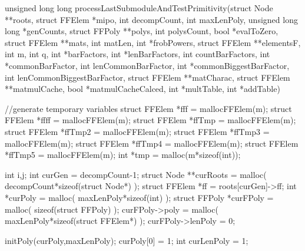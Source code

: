 \begin{ccode}[caption={[\texttt{unsigned long long
  processLastSubmoduleAndTestPrimitivity} aus 
 \url{../Sage/enumeratePCNs.c}]Aus \url{../Sage/enumeratePCNs.c}},
  label=lst:processLastSubmodule]
unsigned long long processLastSubmoduleAndTestPrimitivity(struct Node **roots,
        struct FFElem *mipo, int decompCount,
        int maxLenPoly, 
        unsigned long long *genCounts, 
        struct FFPoly **polys, int polysCount, bool *evalToZero,
        struct FFElem **mats, int matLen, int *frobPowers,
        struct FFElem **elementsF,
        int m, int q, 
        int *barFactors, int *lenBarFactors, int countBarFactors,
        int *commonBarFactor, int lenCommonBarFactor,
        int *commonBiggestBarFactor, int lenCommonBiggestBarFactor,
        struct FFElem **matCharac,
        struct FFElem **matmulCache, bool *matmulCacheCalced,
        int *multTable, int *addTable){
    //generate temporary variables
    struct FFElem *fff = mallocFFElem(m);
    struct FFElem *ffff = mallocFFElem(m);
    struct FFElem *ffTmp = mallocFFElem(m);
    struct FFElem *ffTmp2 = mallocFFElem(m);
    struct FFElem *ffTmp3 = mallocFFElem(m);
    struct FFElem *ffTmp4 = mallocFFElem(m);
    struct FFElem *ffTmp5 = mallocFFElem(m);
    int *tmp = malloc(m*sizeof(int));

    int i,j;
    int curGen = decompCount-1;
    struct Node **curRoots = malloc( decompCount*sizeof(struct Node*) );
    struct FFElem *ff = roots[curGen]->ff;
    int *curPoly = malloc( maxLenPoly*sizeof(int) );
    struct FFPoly *curFPoly = malloc( sizeof(struct FFPoly) );
    curFPoly->poly = malloc( maxLenPoly*sizeof(struct FFElem*) );
    curFPoly->lenPoly = 0;
    
    initPoly(curPoly,maxLenPoly);
    curPoly[0] = 1;
    int curLenPoly = 1;

}
\end{ccode}
